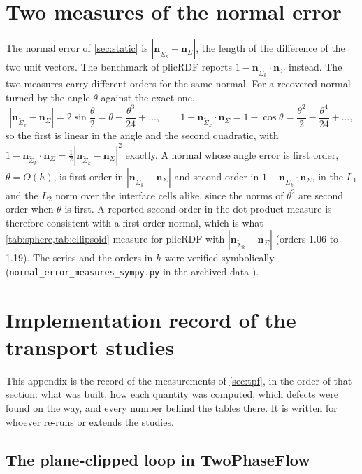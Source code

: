 \documentclass[preprint,12pt]{elsarticle}
\newcommand{\n}{\mathbf{n}}
\newcommand{\nSk}{\mathbf{n}_{\tilde{\Sigma}_k}}
\begin{document}
\appendix
\section{Two measures of the normal error}
\label{app:measures}

The normal error of \cref{sec:static} is $|\nSk - \n_\Sigma|$, the length of the difference of the two unit vectors. The benchmark of plicRDF \citep{ScheuflerRoenby2019} reports $1 - \nSk\cdot\n_\Sigma$ instead. The two measures carry different orders for the same normal. For a recovered normal turned by the angle $\theta$ against the exact one,
\begin{equation}
|\nSk - \n_\Sigma| = 2\sin\frac{\theta}{2} = \theta - \frac{\theta^3}{24} + \ldots, \qquad
1 - \nSk\cdot\n_\Sigma = 1 - \cos\theta = \frac{\theta^2}{2} - \frac{\theta^4}{24} + \ldots ,
\label{eq:measures}
\end{equation}
so the first is linear in the angle and the second quadratic, with $1 - \nSk\cdot\n_\Sigma = \tfrac12|\nSk - \n_\Sigma|^2$ exactly. A normal whose angle error is first order, $\theta = O(h)$, is first order in $|\nSk - \n_\Sigma|$ and second order in $1 - \nSk\cdot\n_\Sigma$, in the $L_1$ and the $L_2$ norm over the interface cells alike, since the norms of $\theta^2$ are second order when $\theta$ is first. A reported second order in the dot-product measure is therefore consistent with a first-order normal, which is what \cref{tab:sphere,tab:ellipsoid} measure for plicRDF with $|\nSk - \n_\Sigma|$ (orders 1.06 to 1.19). The series and the orders in $h$ were verified symbolically (\texttt{normal\_error\_measures\_sympy.py} in the archived data \citep{LeiaRepo2026}).

\section{Implementation record of the transport studies}
\label{app:transport}

This appendix is the record of the measurements of \cref{sec:tpf}, in the order of that section: what was built, how each quantity was computed, which defects were found on the way, and every number behind the tables there. It is written for whoever re-runs or extends the studies.

\subsection{The plane-clipped loop in TwoPhaseFlow}
\label{app:tpf-plane-loop}
\end{document}
